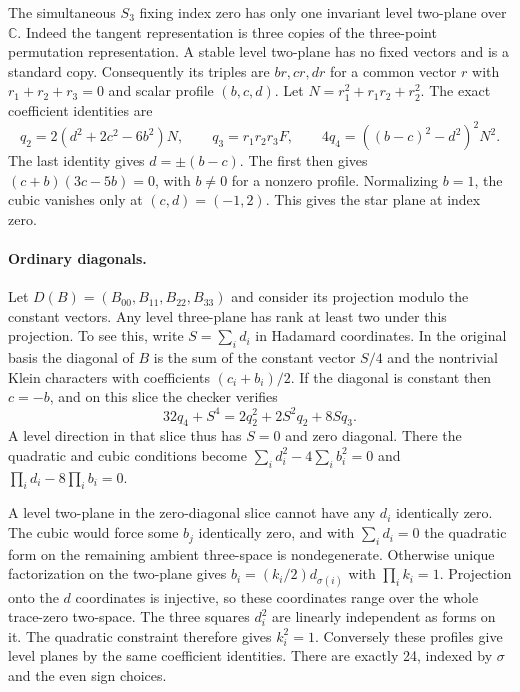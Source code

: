 The simultaneous \(S_3\) fixing index zero has only one invariant
level two-plane over \(\mathbb C\). Indeed the tangent representation
is three copies of the three-point permutation representation. A
stable level two-plane has no fixed vectors and is a standard copy.
Consequently its triples are \(br,cr,dr\) for a common vector \(r\)
with \(r_1+r_2+r_3=0\) and scalar profile \((b,c,d)\). Let
\(N=r_1^2+r_1r_2+r_2^2\). The exact coefficient identities are
\begin{equation*}
 q_2=2(d^2+2c^2-6b^2)N,\qquad
 q_3=r_1r_2r_3 F,\qquad
 4q_4=((b-c)^2-d^2)^2 N^2.
\end{equation*}
The last identity gives \(d=\pm(b-c)\). The first then gives
\((c+b)(3c-5b)=0\), with \(b\ne0\) for a nonzero profile.
Normalizing \(b=1\), the cubic vanishes only at \((c,d)=(-1,2)\).
This gives the star plane at index zero.

\paragraph{Ordinary diagonals.}
Let \(D(B)=(B_{00},B_{11},B_{22},B_{33})\) and consider its projection
modulo the constant vectors. Any level three-plane has rank at least
two under this projection. To see this, write \(S=\sum_i d_i\) in
Hadamard coordinates. In the original basis the diagonal of \(B\) is
the sum of the constant vector \(S/4\) and the nontrivial Klein
characters with coefficients \((c_i+b_i)/2\). If the diagonal is
constant then \(c=-b\), and on this slice the checker verifies
\begin{equation*}
 32q_4+S^4=2q_2^2+2S^2q_2+8S q_3.
\end{equation*}
A level direction in that slice thus has \(S=0\) and zero diagonal.
There the quadratic and cubic conditions become
\(\sum_i d_i^2-4\sum_i b_i^2=0\) and
\(\prod_i d_i-8\prod_i b_i=0\).

A level two-plane in the zero-diagonal slice cannot have any \(d_i\)
identically zero. The cubic would force some \(b_j\) identically zero,
and with \(\sum_i d_i=0\) the quadratic form on the remaining ambient
three-space is nondegenerate. Otherwise unique factorization on the
two-plane gives \(b_i=(k_i/2)d_{\sigma(i)}\) with \(\prod_i k_i=1\).
Projection onto the \(d\) coordinates is injective, so these
coordinates range over the whole trace-zero two-space. The
three squares \(d_i^2\) are linearly independent as forms on it.
The quadratic constraint therefore gives \(k_i^2=1\). Conversely
these profiles give level planes by the same coefficient identities.
There are exactly 24, indexed by \(\sigma\) and the even sign choices.

